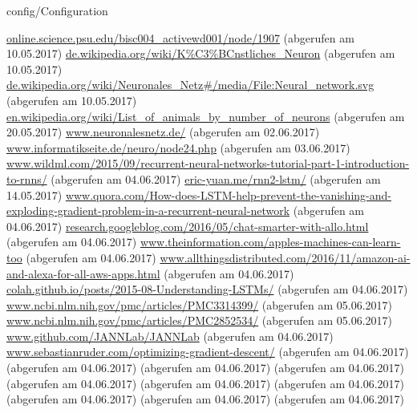 \documentclass[12pt,headsepline,oneside,ngerman]{scrreprt}
\begin{document}
\graphicspath{{figures/}}

 {config/Configuration}
\pagestyle{headings}




%


%
%
%
%
%


%

\cleardoublepage

\begin{thebibliography}{xxxx}
\url{online.science.psu.edu/bisc004_activewd001/node/1907} (abgerufen am 10.05.2017)
\url{de.wikipedia.org/wiki/K%C3%BCnstliches_Neuron} (abgerufen am 10.05.2017)
\url{de.wikipedia.org/wiki/Neuronales_Netz#/media/File:Neural_network.svg} (abgerufen am 10.05.2017)
\url{en.wikipedia.org/wiki/List_of_animals_by_number_of_neurons} (abgerufen am 20.05.2017)
\url{www.neuronalesnetz.de/} (abgerufen am 02.06.2017)
\url{www.informatikseite.de/neuro/node24.php} (abgerufen am 03.06.2017)
\url{www.wildml.com/2015/09/recurrent-neural-networks-tutorial-part-1-introduction-to-rnns/} (abgerufen am 04.06.2017)
\url{eric-yuan.me/rnn2-lstm/} (abgerufen am 14.05.2017)
\url{www.quora.com/How-does-LSTM-help-prevent-the-vanishing-and-exploding-gradient-problem-in-a-recurrent-neural-network} (abgerufen am 04.06.2017)
\url{research.googleblog.com/2016/05/chat-smarter-with-allo.html} (abgerufen am 04.06.2017)
\url{www.theinformation.com/apples-machines-can-learn-too} (abgerufen am 04.06.2017)
\url{www.allthingsdistributed.com/2016/11/amazon-ai-and-alexa-for-all-aws-apps.html} (abgerufen am 04.06.2017)
\url{colah.github.io/posts/2015-08-Understanding-LSTMs/} (abgerufen am 04.06.2017)
\url{www.ncbi.nlm.nih.gov/pmc/articles/PMC3314399/} (abgerufen am 05.06.2017)
\url{www.ncbi.nlm.nih.gov/pmc/articles/PMC2852534/} (abgerufen am 05.06.2017)
\url{www.github.com/JANNLab/JANNLab} (abgerufen am 04.06.2017)
\url{www.sebastianruder.com/optimizing-gradient-descent/} (abgerufen am 04.06.2017)
\url{} (abgerufen am 04.06.2017)
\url{} (abgerufen am 04.06.2017)
\url{} (abgerufen am 04.06.2017)
\url{} (abgerufen am 04.06.2017)
\url{} (abgerufen am 04.06.2017)
\url{} (abgerufen am 04.06.2017)
\url{} (abgerufen am 04.06.2017)
\url{} (abgerufen am 04.06.2017)
\url{} (abgerufen am 04.06.2017)



\end{thebibliography}
\renewcommand{\bibname}{Literaturverzeichnis}

%
\end{document}
